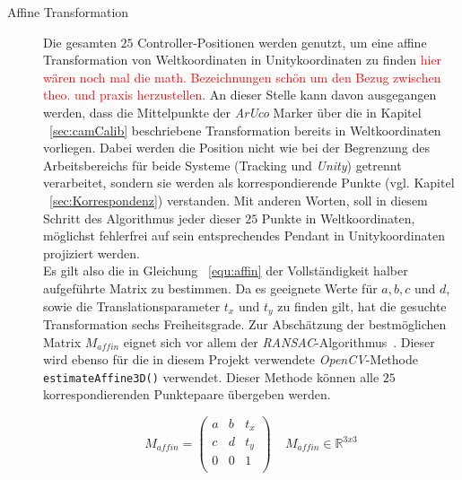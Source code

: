 \begin{description}
\item[Affine Transformation] Die gesamten $25$ Controller-Positionen werden genutzt, um eine affine Transformation von Weltkoordinaten in Unitykoordinaten zu finden \textcolor{red}{hier wären noch mal die math. Bezeichnungen schön um den Bezug zwischen theo. und praxis herzustellen}. An dieser Stelle kann davon ausgegangen werden, dass die Mittelpunkte der \textit{ArUco} Marker über die in Kapitel ~\ref{sec:camCalib} beschriebene Transformation bereits in Weltkoordinaten vorliegen. Dabei werden die Position nicht wie bei der Begrenzung des Arbeitsbereichs für beide Systeme (Tracking und \textit{Unity}) getrennt verarbeitet, sondern sie werden als korrespondierende Punkte (vgl. Kapitel ~\ref{sec:Korrespondenz}) verstanden. Mit anderen Worten, soll in diesem Schritt des Algorithmus jeder dieser $25$ Punkte in Weltkoordinaten, möglichst fehlerfrei auf sein entsprechendes Pendant in Unitykoordinaten projiziert werden. \\
Es gilt also die in Gleichung ~\ref{equ:affin} der Vollständigkeit halber aufgeführte Matrix zu bestimmen. Da es geeignete Werte für $a, b, c$ und $d$, sowie die Translationsparameter $t_x$ und $t_y$ zu finden gilt, hat die gesuchte Transformation sechs Freiheitsgrade. Zur Abschätzung der bestmöglichen Matrix $M_{affin}$ eignet sich vor allem der \textit{RANSAC}-Algorithmus~\cite{articel:RANSAC}. Dieser wird ebenso für die in diesem Projekt verwendete \textit{OpenCV}-Methode \texttt{estimate\-Affine3D()} verwendet. Dieser Methode können alle $25$ korrespondierenden Punktepaare übergeben werden. 

\begin{equation}
\label{equ:affin}
M_{affin} = 
\begin{pmatrix}
a & b & t_x \\
c & d & t_y \\
0 & 0 & 1  \\
\end{pmatrix} 
~ ~ ~ ~ ~M_{affin} \in \mathbb{R}^{3x3}
\end{equation}
\end{description}

